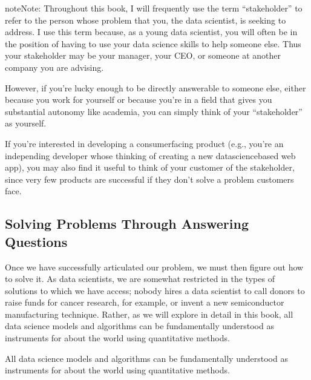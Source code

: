 \documentclass[letterpaper,10pt,english]{jupyterBook}
\begin{document}
\begin{sphinxadmonition}{note}{Note:}
\sphinxAtStartPar
Throughout this book, I will frequently use the term “stakeholder” to refer to the person whose problem that you, the data scientist, is seeking to address. I use this term because, as a young data scientist, you will often be in the position of having to use your data science skills to help someone else. Thus your stakeholder may be your manager, your CEO, or someone at another company you are advising.

\sphinxAtStartPar
However, if you’re lucky enough to  be directly answerable to someone else, either because you work for yourself or because you’re in a field that gives you substantial autonomy like academia, you can simply think of your “stakeholder” as yourself.

\sphinxAtStartPar
If you’re interested in developing a consumer\sphinxhyphen{}facing product (e.g., you’re an independing developer whose thinking of creating a new data\sphinxhyphen{}science\sphinxhyphen{}based web app), you may also find it useful to think of your customer of the stakeholder, since very few products are successful if they don’t solve a problem customers face.
\end{sphinxadmonition}


\subsection{Solving Problems Through Answering Questions}
\label{\detokenize{10_introduction/10_our_approach:solving-problems-through-answering-questions}}
\sphinxAtStartPar
Once we have successfully articulated our problem, we must then figure out how to solve it. As data scientists, we are somewhat restricted in the types of solutions to which we have access; nobody hires a data scientist to call donors to raise funds for cancer research, for example, or invent a new semiconductor manufacturing technique. Rather, as we will explore in detail in this book, all data science models and algorithms can be fundamentally understood as instruments for  about the world using quantitative methods.

\begin{sphinxShadowBox}

\sphinxAtStartPar
All data science models and algorithms can be fundamentally understood as instruments for  about the world using quantitative methods.
\end{sphinxShadowBox}
\end{document}
